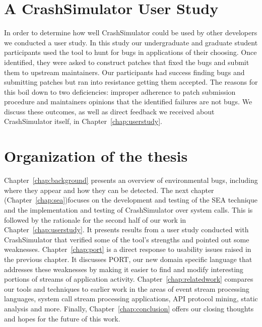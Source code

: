 \section{A CrashSimulator User Study}
In order to determine how well CrashSimulator could be used by other developers we conducted a user study.
In this study our undergraduate and graduate student participants used the tool to hunt for bugs in applications of their choosing.
Once identified, they were asked to construct patches that fixed the bugs and submit them to upstream maintainers.
Our participants had success finding bugs and submitting patches but ran into resistance getting them accepted.
The reasons for this boil down to two deficiencies:
improper adherence to patch submission procedure and maintainers opinions that the identified failures are not bugs.
We discuss these outcomes, as well as direct feedback we received about CrashSimulator itself, in Chapter~\ref{chap:userstudy}.


\section{Organization of the thesis}
\label{sec:organization}
Chapter~\ref{chap:background}
presents an overview of environmental bugs, including where they
appear and how they can be detected.
The next chapter (Chapter~\ref{chap:sea})focuses on the development and testing of the SEA technique and the implementation and testing of CrashSimulator over system calls.
This is followed by the rationale for the second half of our work in  Chapter~\ref{chap:userstudy}. It presents results
from a user study conducted with CrashSimulator that
verified some of the tool's strengths and pointed out some weaknesses.
Chapter~\ref{chap:port}
is a direct response to usability issues raised in the previous chapter. It  discusses PORT,
our new domain specific language that addresses these weaknesses by making
it easier to find and modify interesting portions of streams of
application activity.
Chapter~\ref{chap:relatedwork}
compares our tools and techniques to earlier work in the areas of event stream processing languages, system call stream processing applications, API protocol mining, static analysis and more.
Finally,
Chapter~\ref{chap:conclusion} offers our closing thoughts and hopes for
the future of this work.
